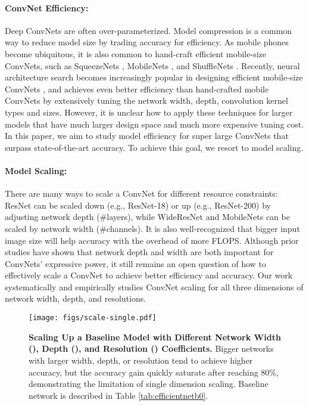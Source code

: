 \documentclass{article}
\begin{document}
\paragraph{ConvNet Efficiency: } Deep ConvNets are often over-parameterized. Model compression \cite{quantize15,amc18,netadapt18} is a common way to reduce model size by trading accuracy for efficiency. As mobile phones become ubiquitous, it is also  common to hand-craft efficient mobile-size ConvNets, such as SqueezeNets \cite{squeezenet16,squeezeNext18}, MobileNets \cite{mobilenetv117,mobilenetv218}, and ShuffleNets \cite{shufflenet17,shufflenetv218}. Recently, neural architecture search becomes increasingly popular in designing efficient mobile-size ConvNets \cite{mnas18,proxyless18}, and achieves even better efficiency than hand-crafted mobile ConvNets by extensively tuning the network width, depth, convolution kernel types and sizes. However, it is  unclear how to apply these techniques for larger models that have much larger design space and much more expensive tuning cost. In this paper, we aim to study model efficiency for super large ConvNets that surpass state-of-the-art accuracy. To achieve this goal, we resort to model scaling.
 
\paragraph{Model Scaling: } There are many ways to scale a ConvNet for different resource constraints: ResNet \cite{resnet16} can be scaled down (e.g., ResNet-18) or up (e.g., ResNet-200) by adjusting network depth (\#layers), while WideResNet \cite{wideresnet16} and MobileNets \cite{mobilenetv117} can be scaled by network width (\#channels).  It is also well-recognized that bigger input image size will help accuracy with the overhead of more FLOPS.  Although prior studies \cite{expressdepth17,expressoneneuron18,expressoverlap18,expresswidth18} have shown that network depth and width are both important for ConvNets' expressive power, it still remains an open question of how to effectively scale a ConvNet to achieve better efficiency and accuracy. Our work systematically and empirically studies ConvNet scaling for all three dimensions of network width, depth, and resolutions.  \begin{figure*}                                                          
        \centering                                                                  
        \texttt{[image: figs/scale-single.pdf]}
        \vskip -0.1in
        \caption{\textbf{Scaling Up a Baseline Model with Different Network Width (),  Depth (), and Resolution () Coefficients.} Bigger networks with larger width, depth, or resolution tend to achieve higher accuracy, but the accuracy gain quickly saturate after reaching 80\%, demonstrating the limitation of single dimension scaling. Baseline network is described in Table \ref{tab:efficientnetb0}.
}
        \label{fig:scale-single}    

\end{figure*} 
\end{document}
